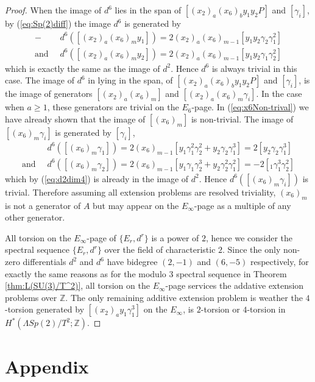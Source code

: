 \documentclass{article}
\theoremstyle{plain}
\theoremstyle{definition}
\numberwithin{thm}{section}
\begin{document}
\begin{proof}
			When the image of $d^6$ lies in the span of $[(x_2)_a(x_6)_by_1y_2P]$ and $[\gamma_i]$, by (\ref{eq:Sp(2)diff}) the image $d^6$ is generated by
			\begin{align*}
											 - & d^6([(x_2)_a(x_6)_my_1])=2(x_2)_a(x_6)_{m-1}[y_1y_2\gamma_2\gamma_1^2] \\
				\text{and} \;\;  & d^6([(x_2)_a(x_6)_my_2])=2(x_2)_a(x_6)_{m-1}[y_1y_2\gamma_1\gamma_2^2]
			\end{align*}
			which is exactly the same as the image of $d^2$.
			Hence $d^6$ is always trivial in this case.
			The image of $d^6$ in lying in the span, of $[(x_2)_a(x_6)_by_1y_2P]$ and $[\gamma_i]$, is
			the image of generators $[(x_2)_a(x_6)_m]$ and $[(x_2)_a(x_6)_m\gamma_i]$.
			In the case when $a\geq 1$, these generators are trivial on the $E_6$-page.
			In (\ref{eq:x6Non-trival}) we have already shown that the image of $[(x_6)_m]$ is non-trivial.
			The image of $[(x_6)_m\gamma_i]$ is generated by $[\gamma_i]$,
			\begin{align*}
											   & d^6([(x_6)_m\gamma_1])=2(x_6)_{m-1}[y_1\gamma_1^2\gamma_2^2+y_2\gamma_2\gamma_1^3]=2[y_2\gamma_2\gamma_1^3] \\
				\text{and} \;\;  & d^6([(x_6)_m\gamma_2])=2(x_6)_{m-1}[y_1\gamma_1\gamma_2^3+y_2\gamma_2^2\gamma_1^2]=-2[_1\gamma_1^3\gamma_2^2]
			\end{align*}
			which by (\ref{eq:d2dim4}) is already in the image of $d^2$.
			Hence $d^6([(x_6)_m\gamma_i])$ is trivial.
			Therefore assuming all extension problems are resolved triviality,
			$(x_6)_m$ is not a generator of $A$ but may appear on the $E_\infty$-page
			as a multiple of any other generator.
			
			All torsion on the $E_\infty$-page of $\{ E_r,d^r \}$ is a power of $2$,
			hence we consider the spectral sequence $\{ E_r,d^r \}$ over the field of characteristic $2$.
			Since the only non-zero differentials $d^2$ and $d^6$ have bidegree $(2,-1)$ and $(6,-5)$ respectively, 
			for exactly the same reasons as for the modulo $3$ spectral sequence in Theorem \ref{thm:L(SU(3)/T^2)},
			all torsion on the $E_\infty$-page services the addative extension problems over $\mathbb{Z}$.
			The only remaining additive extension problem is weather the $4$-torsion generated by $[(x_2)_ay_1\gamma^3_1]$ on the $E_\infty$,
			is $2$-torsion or $4$-torsion in $H^*(\Lambda Sp(2)/T^2;\mathbb{Z})$.
		\end{proof}

\newpage
\section{Appendix}
		
\end{document}
